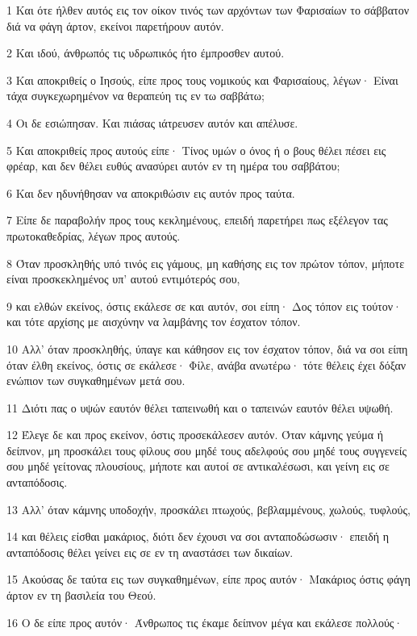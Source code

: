 \par 1 Και ότε ήλθεν αυτός εις τον οίκον τινός των αρχόντων των Φαρισαίων το σάββατον διά να φάγη άρτον, εκείνοι παρετήρουν αυτόν.
\par 2 Και ιδού, άνθρωπός τις υδρωπικός ήτο έμπροσθεν αυτού.
\par 3 Και αποκριθείς ο Ιησούς, είπε προς τους νομικούς και Φαρισαίους, λέγων· Είναι τάχα συγκεχωρημένον να θεραπεύη τις εν τω σαββάτω;
\par 4 Οι δε εσιώπησαν. Και πιάσας ιάτρευσεν αυτόν και απέλυσε.
\par 5 Και αποκριθείς προς αυτούς είπε· Τίνος υμών ο όνος ή ο βους θέλει πέσει εις φρέαρ, και δεν θέλει ευθύς ανασύρει αυτόν εν τη ημέρα του σαββάτου;
\par 6 Και δεν ηδυνήθησαν να αποκριθώσιν εις αυτόν προς ταύτα.
\par 7 Είπε δε παραβολήν προς τους κεκλημένους, επειδή παρετήρει πως εξέλεγον τας πρωτοκαθεδρίας, λέγων προς αυτούς.
\par 8 Όταν προσκληθής υπό τινός εις γάμους, μη καθήσης εις τον πρώτον τόπον, μήποτε είναι προσκεκλημένος υπ' αυτού εντιμότερός σου,
\par 9 και ελθών εκείνος, όστις εκάλεσε σε και αυτόν, σοι είπη· Δος τόπον εις τούτον· και τότε αρχίσης με αισχύνην να λαμβάνης τον έσχατον τόπον.
\par 10 Αλλ' όταν προσκληθής, ύπαγε και κάθησον εις τον έσχατον τόπον, διά να σοι είπη όταν έλθη εκείνος, όστις σε εκάλεσε· Φίλε, ανάβα ανωτέρω· τότε θέλεις έχει δόξαν ενώπιον των συγκαθημένων μετά σου.
\par 11 Διότι πας ο υψών εαυτόν θέλει ταπεινωθή και ο ταπεινών εαυτόν θέλει υψωθή.
\par 12 Έλεγε δε και προς εκείνον, όστις προσεκάλεσεν αυτόν. Όταν κάμνης γεύμα ή δείπνον, μη προσκάλει τους φίλους σου μηδέ τους αδελφούς σου μηδέ τους συγγενείς σου μηδέ γείτονας πλουσίους, μήποτε και αυτοί σε αντικαλέσωσι, και γείνη εις σε ανταπόδοσις.
\par 13 Αλλ' όταν κάμνης υποδοχήν, προσκάλει πτωχούς, βεβλαμμένους, χωλούς, τυφλούς,
\par 14 και θέλεις είσθαι μακάριος, διότι δεν έχουσι να σοι ανταποδώσωσιν· επειδή η ανταπόδοσις θέλει γείνει εις σε εν τη αναστάσει των δικαίων.
\par 15 Ακούσας δε ταύτα εις των συγκαθημένων, είπε προς αυτόν· Μακάριος όστις φάγη άρτον εν τη βασιλεία του Θεού.
\par 16 Ο δε είπε προς αυτόν· Άνθρωπος τις έκαμε δείπνον μέγα και εκάλεσε πολλούς·

